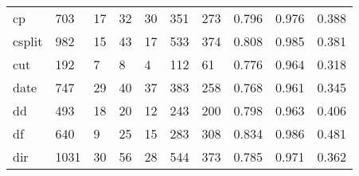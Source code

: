 \begin{longtable}{lp{2.0cm}p{2.0cm}p{2.0cm}p{2.0cm}p{2.0cm}p{2.0cm}p{2.0cm}p{2.0cm}p{2.0cm}}
cp        &                    703 &                                 17 &                                32 &                               30 &                               351 &                             273 &                                   0.796 &                                  0.976 &                                0.388 \\
csplit    &                    982 &                                 15 &                                43 &                               17 &                               533 &                             374 &                                   0.808 &                                  0.985 &                                0.381 \\
cut       &                    192 &                                  7 &                                 8 &                                4 &                               112 &                              61 &                                   0.776 &                                  0.964 &                                0.318 \\
date      &                    747 &                                 29 &                                40 &                               37 &                               383 &                             258 &                                   0.768 &                                  0.961 &                                0.345 \\
dd        &                    493 &                                 18 &                                20 &                               12 &                               243 &                             200 &                                   0.798 &                                  0.963 &                                0.406 \\
df        &                    640 &                                  9 &                                25 &                               15 &                               283 &                             308 &                                   0.834 &                                  0.986 &                                0.481 \\
dir       &                   1031 &                                 30 &                                56 &                               28 &                               544 &                             373 &                                   0.785 &                                  0.971 &                                0.362 \\

\end{longtable}
